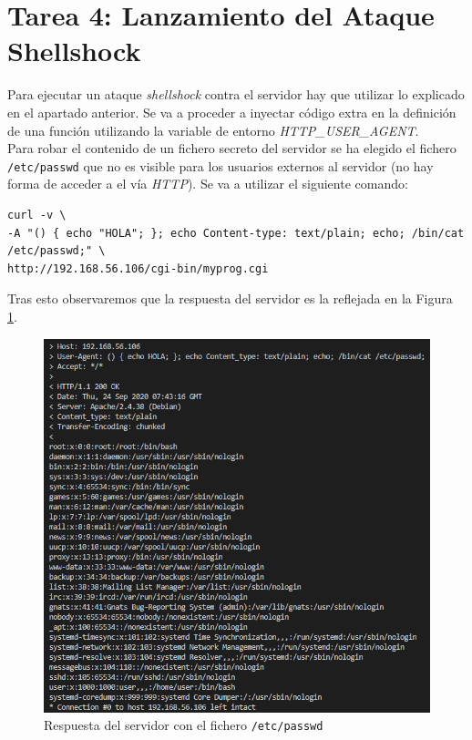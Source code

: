 \documentclass[10pt,a4paper]{article}
\begin{document}
\newpage
\section{Tarea 4: Lanzamiento del Ataque Shellshock}

Para ejecutar un ataque \emph{shellshock} contra el servidor hay que utilizar lo explicado en el apartado anterior. Se va a proceder a inyectar código extra en la definición de una función utilizando la variable de entorno \emph{HTTP\_{}USER\_{}AGENT}.\\

Para robar el contenido de un fichero secreto del servidor se ha elegido el fichero \texttt{/etc/passwd} que no es visible para los usuarios externos al servidor (no hay forma de acceder a el vía \emph{HTTP}). Se va a utilizar el siguiente comando:

\begin{lstlisting}
curl -v \
-A "() { echo "HOLA"; }; echo Content-type: text/plain; echo; /bin/cat /etc/passwd;" \
http://192.168.56.106/cgi-bin/myprog.cgi
\end{lstlisting}

Tras esto observaremos que la respuesta del servidor es la reflejada en la Figura \ref{fig:tarea4_a}.

\begin{figure}[h!]
\centering
\includegraphics[scale=0.7]{images/Tarea_4a.png}
\caption{Respuesta del servidor con el fichero \texttt{/etc/passwd}}
\label{fig:tarea4_a} 
\end{figure}
\end{document}
